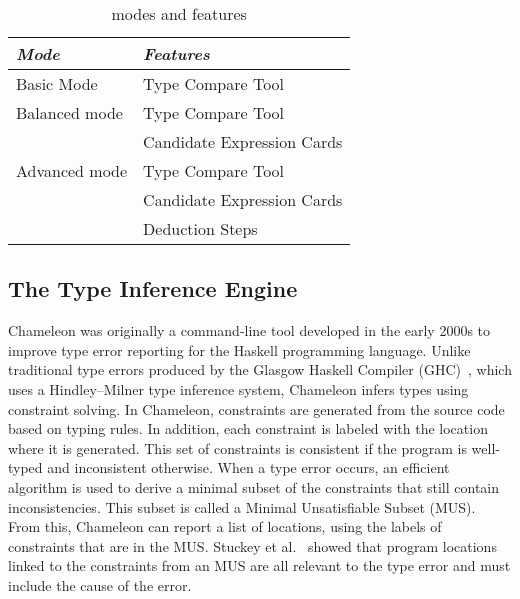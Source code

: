 \begin{table}
    \centering
\begin{scriptsize}
\begin{center}

    \begin{tabular}{ l l  }
     \textit{Mode} & \textit{Features} \\ \hline
     Basic Mode & Type Compare Tool \\ \hline
     Balanced mode & Type Compare Tool \\
     & Candidate Expression Cards \\  \hline
     Advanced mode & Type Compare Tool \\
     & Candidate Expression Cards \\
     & Deduction Steps \\
    \end{tabular}
    \end{center}
\end{scriptsize}
    \caption{\chameleon{} modes and features}
    \label {tab:chameleon-features}
\end{table}


\subsection{The Type Inference Engine}
\label{sec:typeinferenceengine}

Chameleon was originally a command-line tool developed in the early 2000s to improve type error reporting %
for the Haskell programming language.
Unlike traditional type errors produced by the Glasgow Haskell Compiler (GHC)~\cite{Gamari_undated-zu}, which uses a Hindley–Milner type inference system, Chameleon infers types using constraint solving. In Chameleon, constraints are generated from the source code based on typing rules. In addition, each constraint is labeled with the location where it is generated. This set of constraints is consistent if the program is well-typed and inconsistent otherwise. When a type error occurs, an efficient algorithm is used to derive a minimal subset of the constraints that still contain inconsistencies. This subset is called a Minimal Unsatisfiable Subset (MUS). From this, Chameleon can report a list of locations, using the labels of constraints that are in the MUS. Stuckey et al.~\cite{Stuckey2003-pz} showed that program locations linked to the constraints from an MUS are all relevant to the type error and must include the cause of the error.

